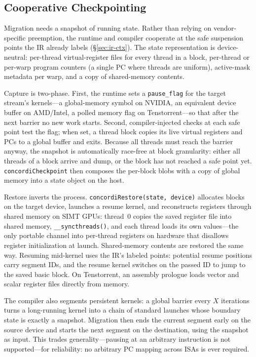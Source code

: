\documentclass[sigplan,nonacm]{acmart}
\begin{document}
\subsection{Cooperative Checkpointing}
\label{sec:checkpoint}

Migration needs a snapshot of running state.  Rather than relying on
vendor-specific preemption, the runtime and compiler cooperate at the safe
suspension points the IR already labels (\S\ref{sec:ir-ctx}).  The state
representation is device-neutral: per-thread virtual-register files for
every thread in a block, per-thread or per-warp program counters (a single
PC where threads are uniform), active-mask metadata per warp, and a copy of
shared-memory contents.

Capture is two-phase.  First, the runtime sets a \texttt{pause\_flag} for
the target stream's kernels---a global-memory symbol on NVIDIA, an
equivalent device buffer on AMD/Intel, a polled memory flag on
Tenstorrent---so that after the next barrier no new work starts.  Second,
compiler-injected checks at each safe point test the flag; when set, a
thread block copies its live virtual registers and PCs to a global buffer
and exits.  Because all threads must reach the barrier anyway, the snapshot
is automatically race-free at block granularity: either all threads of a
block arrive and dump, or the block has not reached a safe point yet.
\texttt{concordiCheckpoint} then composes the per-block blobs with a copy of
global memory into a state object on the host.

Restore inverts the process.  \texttt{concordiRestore(state, device)}
allocates blocks on the target device, launches a resume kernel, and
reconstructs registers through shared memory on SIMT GPUs: thread~0 copies
the saved register file into shared memory,
\texttt{\_\_syncthreads()}, and each thread loads its own values---the
only portable channel into per-thread registers on hardware that disallows
register initialization at launch.  Shared-memory contents are restored the
same way.  Resuming mid-kernel uses the IR's labeled points: potential
resume positions carry segment IDs, and the resume kernel switches on the
passed ID to jump to the saved basic block.  On Tenstorrent, an assembly
prologue loads vector and scalar register files directly from memory.

The compiler also segments persistent kernels: a global barrier every $X$
iterations turns a long-running kernel into a chain of standard launches
whose boundary state is exactly a snapshot.  Migration then ends the current
segment early on the source device and starts the next segment on the
destination, using the snapshot as input.  This trades generality---pausing
at an arbitrary instruction is not supported---for reliability: no
arbitrary PC mapping across ISAs is ever required.
\end{document}
